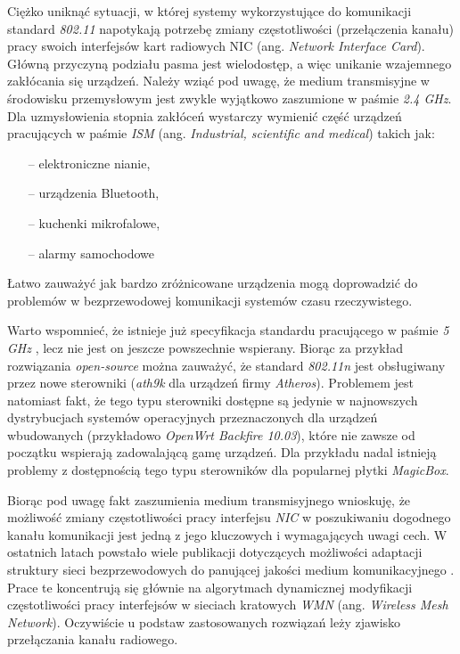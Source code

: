 %

Ciężko uniknąć sytuacji, w której systemy wykorzystujące do komunikacji standard \emph{802.11} napotykają potrzebę zmiany częstotliwości (przełączenia kanału) pracy swoich interfejsów kart radiowych NIC (ang. \emph{Network Interface Card}). Główną przyczyną podziału pasma jest wielodostęp, a więc unikanie wzajemnego zakłócania się urządzeń. Należy wziąć pod uwagę, że medium transmisyjne w środowisku przemysłowym jest zwykle wyjątkowo zaszumione w paśmie \emph{2.4 GHz}. Dla uzmysłowienia stopnia zakłóceń wystarczy wymienić część urządzeń pracujących w paśmie \emph{ISM} (ang. \emph{Industrial, scientific and medical}) takich jak:
\begin{itemize}
\item[--] elektroniczne nianie,
\item[--] urządzenia Bluetooth,
\item[--] kuchenki mikrofalowe,
\item[--] alarmy samochodowe
\end{itemize}
Łatwo zauważyć jak bardzo zróżnicowane urządzenia mogą doprowadzić do problemów w bezprzewodowej komunikacji systemów czasu rzeczywistego.

Warto wspomnieć, że istnieje już specyfikacja standardu pracującego w paśmie \emph{5 GHz} \cite{std:IEEE80211n}, lecz nie jest on jeszcze powszechnie wspierany. Biorąc za przykład rozwiązania \emph{open-source} można zauważyć, że standard \emph{802.11n} jest obsługiwany przez nowe sterowniki (\emph{ath9k} dla urządzeń firmy \emph{Atheros}). Problemem jest natomiast fakt, że tego typu sterowniki dostępne są jedynie w najnowszych dystrybucjach systemów operacyjnych przeznaczonych dla urządzeń wbudowanych (przykładowo \emph{OpenWrt Backfire 10.03}), które nie zawsze od początku wspierają zadowalającą gamę urządzeń. Dla przykładu nadal istnieją problemy z dostępnością tego typu sterowników dla popularnej płytki \emph{MagicBox}.

Biorąc pod uwagę fakt zaszumienia medium transmisyjnego wnioskuję, że możliwość zmiany częstotliwości pracy interfejsu \emph{NIC} w poszukiwaniu dogodnego kanału komunikacji jest jedną z jego kluczowych i wymagających uwagi cech. W ostatnich latach powstało wiele publikacji dotyczących możliwości adaptacji struktury sieci bezprzewodowych do panującej jakości medium komunikacyjnego \cite{pub:DCS}. Prace te koncentrują się głównie na algorytmach dynamicznej modyfikacji częstotliwości pracy interfejsów w sieciach kratowych \emph{WMN} (ang. \emph{Wireless Mesh Network}). Oczywiście u podstaw zastosowanych rozwiązań leży zjawisko przełączania kanału radiowego.

